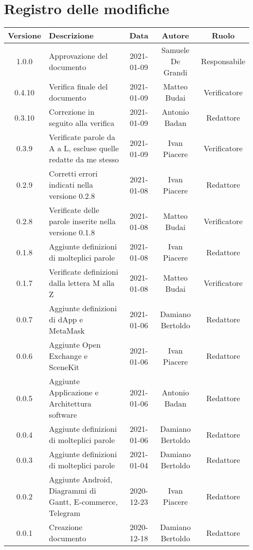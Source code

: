 \section*{Registro delle modifiche}

\begin{center}
	\begin{longtable}{|c|p{5cm}|c|c|c|}
	\hline
	\rowcolor{lighter-grayer}
	\textbf{Versione} & \textbf{Descrizione} & \textbf{Data} & \textbf{Autore} & \textbf{Ruolo} \\
	\hline
	\endfirsthead

	1.0.0 & Approvazione del documento & 2021-01-09 & Samuele De Grandi & Responsabile \\
	\hline
	0.4.10 & Verifica finale del documento & 2021-01-09 & Matteo Budai & Verificatore \\
	\hline
	0.3.10 & Correzione in seguito alla verifica & 2021-01-09 & Antonio Badan & Redattore \\
	\hline
	0.3.9 & Verificate parole da A a L, escluse quelle redatte da me stesso & 2021-01-09 & Ivan Piacere & Verificatore \\
	\hline
	0.2.9 & Corretti errori indicati nella versione 0.2.8 & 2021-01-08 & Ivan Piacere & Redattore \\
	\hline
	0.2.8 & Verificate delle parole inserite nella versione 0.1.8 & 2021-01-08 & Matteo Budai & Verificatore \\
	\hline
	0.1.8 & Aggiunte definizioni di molteplici parole & 2021-01-08 & Ivan Piacere & Redattore \\
	\hline
	0.1.7 & Verificate definizioni dalla lettera M alla Z & 2021-01-08 & Matteo Budai & Verificatore \\
	\hline
	0.0.7 & Aggiunte definizioni di dApp e MetaMask & 2021-01-06 & Damiano Bertoldo & Redattore \\
	\hline
	0.0.6 & Aggiunte Open Exchange e SceneKit & 2021-01-06 & Ivan Piacere & Redattore \\
	\hline
	0.0.5 & Aggiunte Applicazione e Architettura software & 2021-01-06 & Antonio Badan & Redattore \\
	\hline
	0.0.4 & Aggiunte definizioni di molteplici parole & 2021-01-06 & Damiano Bertoldo & Redattore \\
	\hline
	0.0.3 & Aggiunte definizioni di molteplici parole & 2021-01-04 & Damiano Bertoldo & Redattore \\
	\hline
	0.0.2 & Aggiunte Android, Diagrammi di Gantt, E-commerce, Telegram & 2020-12-23 & Ivan Piacere & Redattore \\
	\hline
	0.0.1 & Creazione documento & 2020-12-18 & Damiano Bertoldo & Redattore \\
	\hline

	\end{longtable}
\end{center}